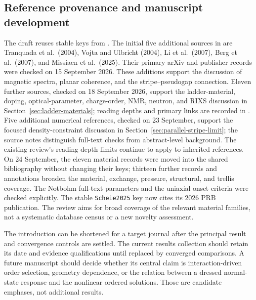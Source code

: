 \documentclass[11pt,letterpaper]{article}
\newcommand{\projectdocroot}{.}%
\newcommand{\manuscriptroot}{manuscript}%
\newcommand{\projectdocroot}{..}%
\newcommand{\manuscriptroot}{.}%
\begin{document}
\subsection{Reference provenance and manuscript development}

The draft reuses stable keys from .
The initial five additional sources in  are
Tranquada et al.\ (2004), Vojta and Ulbricht (2004), Li et al.\ (2007),
Berg et al.\ (2007), and Missiaen et al.\ (2025). Their primary arXiv and
publisher records were checked on 15 September 2026. These additions
support the discussion of magnetic spectra, planar coherence, and the
stripe--pseudogap connection. Eleven further sources, checked on
18 September 2026, support the ladder-material, doping, optical-parameter,
charge-order, NMR, neutron, and RIXS discussion in
Section~\ref{sec:ladder-materials}; reading depths and primary links are
recorded in . Five additional numerical references,
checked on 23 September, support the focused density-constraint discussion
in Section~\ref{sec:parallel-stripe-limit}; the source notes distinguish
full-text checks from abstract-level background. The existing review's reading-depth limits
continue to apply to inherited references. On 24 September, the eleven material
records were moved into the shared bibliography without changing their keys;
thirteen further records and annotations broaden the material, exchange,
pressure, structural, and trellis coverage. The Notbohm full-text parameters
and the uniaxial onset criteria were checked explicitly. The stable
\texttt{Scheie2025} key now cites its 2026 PRB publication. The review aims
for broad coverage of the relevant material families, not a systematic
database census or a new novelty assessment.

The introduction can be shortened for a target journal after the principal
result and convergence controls are settled. The current results collection
should retain its date and evidence qualifications until replaced by
converged comparisons. A future manuscript should decide whether its central
claim is interaction-driven order selection, geometry dependence, or the
relation between a dressed normal-state response and the nonlinear ordered
solutions. Those are candidate emphases, not additional results.

\clearpage
\begingroup
\setlength{\bibsep}{0.20em}
\renewcommand{\bibpreamble}{\interlinepenalty=10000}


\endgroup
\end{document}
